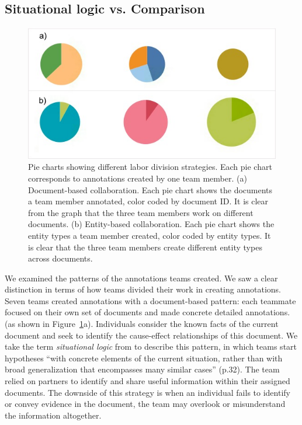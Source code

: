 \subsection{Situational logic vs. Comparison}

\begin{figure}
	\centering
	\includegraphics[width=\columnwidth]{04-Study_one/img/labor_division.jpg}
	\caption{Pie charts showing different labor division strategies. Each
		pie chart corresponds to annotations created by one team member. (a) Document-based
		collaboration. Each pie chart shows the documents a team member
		annotated, color coded by document ID. It is clear from the graph that the three team members work on different documents. (b) Entity-based collaboration.
		Each pie chart shows the entity types a team member created, color
		coded by entity types. It is clear that the three team members create different entity types across documents.
	\label{fig:labor_division}}
\end{figure}

We examined the patterns of the annotations teams created. We saw a clear distinction in terms of how teams divided their work in creating annotations. Seven
teams created annotations with a document-based pattern: each teammate focused on their own set of documents and made concrete detailed annotations.
(as shown in Figure~\ref{fig:labor_division}a). Individuals consider the known facts of the current document and seek to identify the cause-effect relationships of this document. We take the term \textit{situational logic} from \citep{Heuer1999} to describe this pattern, in which teams start hypotheses ``with concrete elements of the current situation, rather than with broad generalization that encompasses many similar cases'' (p.32). The team relied on partners to identify and share useful information within their assigned documents. The downside of this
strategy is when an individual fails to identify or convey
evidence in the document, the team may overlook or misunderstand the information
altogether.

